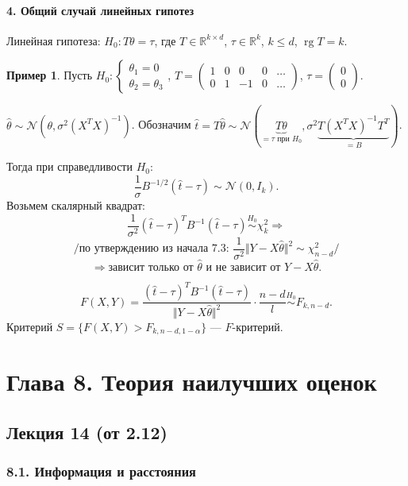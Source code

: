 \documentclass[12pt]{report}
\DeclareMathOperator{\rg}{rg}
\theoremstyle{definition}
\newtheorem{example}{Пример}
\begin{document}
\subsubsection{4. Общий случай линейных гипотез}
Линейная гипотеза: $H_0: T\theta = \tau$, где $T \in \mathbb{R}^{k\times d}$, $\tau \in \mathbb{R}^k$, $k \leqslant d$, $\rg T = k$.
\begin{example}
	Пусть $
	H_0: 
	\begin{cases}
		\theta_1 = 0 \\
		\theta_2 = \theta_3
	\end{cases}
	$, $T = \begin{pmatrix}
		1 & 0 & 0 & 0 & \ldots \\
		0 & 1 & -1 & 0 & \ldots 
	\end{pmatrix}$, $\tau = \begin{pmatrix}
		0 \\
		0
	\end{pmatrix}$.

	$\hat{\theta} \sim \mathcal{N}(\theta, \sigma^2(X^T X)^{-1})$. Обозначим $\hat{t} = T\hat{\theta} \sim \mathcal{N}(\underbrace{T\theta}_{=\tau \text{ при } H_0}, \sigma^2\underbrace{T(X^T X)^{-1} T^T}_{=B})$.

	Тогда при справедливости $H_0$:
	$$\dfrac{1}{\sigma}B^{-1/2}(\hat{t} - \tau) \sim \mathcal{N}(0, I_k).$$
	Возьмем скалярный квадрат:
	$$\dfrac{1}{\sigma^2}(\hat{t} - \tau)^T B^{-1}(\hat{t} - \tau) \stackrel{H_0}{\sim} \chi^2_k \Rightarrow$$
	$$/ \text{по утверждению из начала 7.3: } \dfrac{1}{\sigma^2}\Vert Y - X\hat{\theta}\Vert^2 \sim \chi^2_{n-d}/$$
	$$\Rightarrow \text{зависит только от }\hat{\theta} \text{ и не зависит от }Y - X\hat{\theta}.$$

	$$F(X, Y) = \dfrac{(\hat{t} - \tau)^TB^{-1}(\hat{t} - \tau)}{\Vert Y - X\hat{\theta} \Vert^2} \cdot \dfrac{n-d}{l} \stackrel{H_0}{\sim} F_{k, n-d}.$$
	Критерий $S = \{F(X, Y) > F_{k, n-d, 1-\alpha}\}$ — $F$-критерий.
\end{example}

\chapter{Глава 8. Теория наилучших оценок}
\section{Лекция 14 (от 2.12)}
\subsection{8.1. Информация и расстояния}
\end{document}
